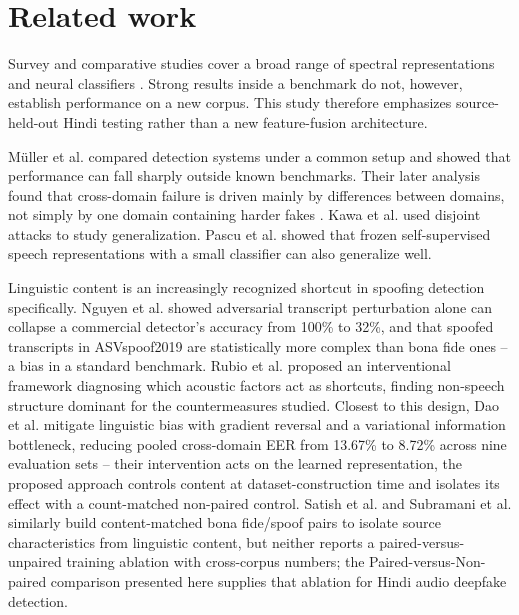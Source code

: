 \documentclass[3p,times,procedia]{elsarticle}
\begin{document}
\section{Related work}
Survey and comparative studies cover a broad range of spectral
representations and neural classifiers
\cite{salih2025review,verma2025comparative,zhang2025survey}. Strong results
inside a benchmark do not, however, establish performance on a new corpus.
This study therefore emphasizes source-held-out Hindi testing rather than a
new feature-fusion architecture.

M{\"u}ller et al. \cite{muller2022generalize} compared detection systems under
a common setup and showed that performance can fall sharply outside known
benchmarks. Their later analysis found that cross-domain failure is driven
mainly by differences between domains, not simply by one domain containing
harder fakes \cite{muller2024harder}. Kawa et al. \cite{kawa2022attack}
used disjoint attacks to study generalization. Pascu et al.
\cite{pascu2024calibrated} showed that frozen self-supervised speech
representations with a small classifier can also generalize well.

Linguistic content is an increasingly recognized shortcut in spoofing
detection specifically. Nguyen et al. \cite{nguyen2025linguistic} showed
adversarial transcript perturbation alone can collapse a commercial
detector's accuracy from 100\% to 32\%, and that spoofed transcripts in
ASVspoof2019 are statistically more complex than bona fide ones -- a bias
in a standard benchmark. Rubio et al. \cite{rubio2026intervention} proposed
an interventional framework diagnosing which acoustic factors act as
shortcuts, finding non-speech structure dominant for the countermeasures
studied. Closest to this design, Dao et al. \cite{dao2026linguistic}
mitigate linguistic bias with gradient reversal and a variational
information bottleneck, reducing pooled cross-domain EER from 13.67\% to
8.72\% across nine evaluation sets -- their intervention acts on the
learned representation, the proposed approach controls content at dataset-construction time
and isolates its effect with a count-matched non-paired control. Satish et
al. \cite{satish2026whatcounts} and Subramani et al.
\cite{subramani2026ljspoof} similarly build content-matched bona fide/spoof
pairs to isolate source characteristics from linguistic content, but
neither reports a paired-versus-unpaired training ablation with
cross-corpus numbers; the Paired-versus-Non-paired comparison presented here supplies that
ablation for Hindi audio deepfake detection.
\end{document}
